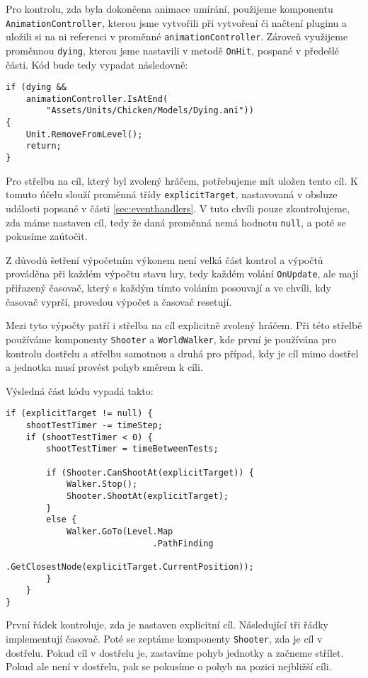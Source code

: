Pro kontrolu, zda byla dokončena animace umírání, použijeme komponentu \texttt{AnimationController}, kterou jsme vytvořili při vytvoření či načtení pluginu a uložili si na ni referenci v proměnné \texttt{animationController}. Zároveň využijeme proměnnou \texttt{dying}, kterou jsme nastavili v metodě \texttt{OnHit}, pospané v předešlé části. Kód bude tedy vypadat následovně:

\begin{lstlisting}
if (dying && 
	animationController.IsAtEnd(
		"Assets/Units/Chicken/Models/Dying.ani")) 
{
	Unit.RemoveFromLevel();
	return;
}
\end{lstlisting}

Pro střelbu na cíl, který byl zvolený hráčem, potřebujeme mít uložen tento cíl. K tomuto účelu slouží proměnná třídy \texttt{explicitTarget}, nastavovaná v obsluze události popsané v části \ref{sec:eventhandlers}. V tuto chvíli pouze zkontrolujeme, zda máme nastaven cíl, tedy že daná proměnná nemá hodnotu \texttt{null}, a poté se pokusíme zaútočit.

Z důvodů šetření výpočetním výkonem není velká část kontrol a výpočtů prováděna při každém výpočtu stavu hry, tedy každém volání \texttt{OnUpdate}, ale mají přiřazený časovač, který s každým tímto voláním posouvají a ve chvíli, kdy časovač vyprší, provedou výpočet a časovač resetují.

Mezi tyto výpočty patří i střelba na cíl explicitně zvolený hráčem. Při této střelbě používáme komponenty \texttt{Shooter} a \texttt{WorldWalker}, kde první je používána pro kontrolu dostřelu a střelbu samotnou a druhá pro případ, kdy je cíl mimo dostřel a jednotka musí provést pohyb směrem k cíli.

Výsledná část kódu vypadá takto:
\begin{lstlisting}
if (explicitTarget != null) {
	shootTestTimer -= timeStep;
	if (shootTestTimer < 0) {
		shootTestTimer = timeBetweenTests;

		if (Shooter.CanShootAt(explicitTarget)) {
			Walker.Stop();
			Shooter.ShootAt(explicitTarget);
		}
		else {			
			Walker.GoTo(Level.Map
							 .PathFinding
							 .GetClosestNode(explicitTarget.CurrentPosition));
		}
	}
}
\end{lstlisting}

První řádek kontroluje, zda je nastaven explicitní cíl. Následující tři řádky implementují časovač. Poté se zeptáme komponenty \texttt{Shooter}, zda je cíl v dostřelu. Pokud cíl v dostřelu je, zastavíme pohyb jednotky a začneme střílet. Pokud ale není v dostřelu, pak se pokusíme o pohyb na pozici nejbližší cíli.


